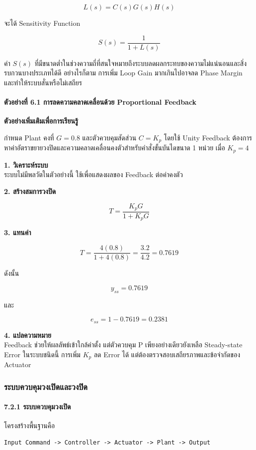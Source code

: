 \[
L(s)=C(s)G(s)H(s)
\]

จะได้ Sensitivity Function

\[
S(s)=\frac{1}{1+L(s)}
\]

ค่า $S(s)$ ที่มีขนาดต่ำในช่วงความถี่ที่สนใจหมายถึงระบบลดผลกระทบของความไม่แน่นอนและสิ่งรบกวนบางประเภทได้ดี อย่างไรก็ตาม การเพิ่ม Loop Gain มากเกินไปอาจลด Phase Margin และทำให้ระบบสั่นหรือไม่เสถียร

\paragraph{ตัวอย่างที่ 6.1 การลดความคลาดเคลื่อนด้วย Proportional Feedback}

\textbf{ตัวอย่างเพิ่มเติมเพื่อการเรียนรู้}

กำหนด Plant คงที่ $G=0.8$ และตัวควบคุมสัดส่วน $C=K_p$ โดยใช้ Unity Feedback ต้องการหาค่าอัตราขยายวงปิดและความคลาดเคลื่อนคงตัวสำหรับคำสั่งขั้นบันไดขนาด 1 หน่วย เมื่อ $K_p=4$

\textbf{1. วิเคราะห์ระบบ} \\
ระบบไม่มีพลวัตในตัวอย่างนี้ ใช้เพื่อแสดงผลของ Feedback ต่อค่าคงตัว

\textbf{2. สร้างสมการวงปิด}

\[
T=\frac{K_pG}{1+K_pG}
\]

\textbf{3. แทนค่า}

\[
T=\frac{4(0.8)}{1+4(0.8)}=\frac{3.2}{4.2}=0.7619
\]

ดังนั้น

\[
y_{ss}=0.7619
\]

และ

\[
e_{ss}=1-0.7619=0.2381
\]

\textbf{4. แปลความหมาย} \\
Feedback ช่วยให้ผลลัพธ์เข้าใกล้ค่าตั้ง แต่ตัวควบคุม P เพียงอย่างเดียวยังเหลือ Steady-state Error ในระบบชนิดนี้ การเพิ่ม $K_p$ ลด Error ได้ แต่ต้องตรวจสอบเสถียรภาพและข้อจำกัดของ Actuator

\newpage

\subsubsection{ระบบควบคุมวงเปิดและวงปิด}

\paragraph{7.2.1 ระบบควบคุมวงเปิด}

โครงสร้างพื้นฐานคือ

\begin{verbatim}
Input Command -> Controller -> Actuator -> Plant -> Output
\end{verbatim}

